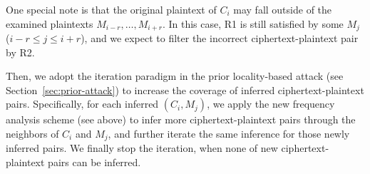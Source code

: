 \documentclass[bachelor]{thesis-uestc}
\begin{document}
One special note is that the original plaintext of $C_i$ may fall outside of
the examined plaintexts $M_{i-r}, \ldots, M_{i+r}$. 
In this case, R1 is still satisfied by some $M_j$ ($i-r \leq j \leq i+r$), and we expect to filter the incorrect ciphertext-plaintext pair by R2.     




Then, we adopt the iteration paradigm in the prior locality-based attack \cite{li17} (see Section~\ref{sec:prior-attack}) to increase the coverage of inferred ciphertext-plaintext pairs. Specifically, for each inferred $(C_i, M_j)$, we apply the new frequency analysis scheme (see above) to infer more ciphertext-plaintext pairs through the neighbors of $C_i$ and $M_j$, and further iterate the same inference for those newly inferred pairs. We finally stop the iteration, when none of new ciphertext-plaintext pairs can be inferred.         


\end{document}
